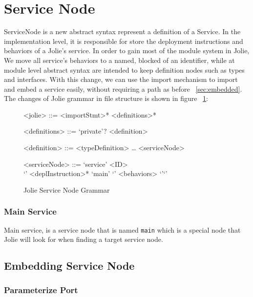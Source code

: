
\section{Service Node}

ServiceNode is a new abstract syntax represent a definition of a Service.
In the implementation level, it is responsible for store the deployment instructions and behaviors of a Jolie’s service.
In order to gain most of the module system in Jolie,  We move all service’s behaviors to a named, blocked of an identifier, while at module level abstract syntax are intended to keep definition nodes such as types and interfaces.
With this change, we can use the import mechanism to import and embed a service easily, without requiring a path as before ~\ref{sec:embedded}.
The changes of Jolie grammar in file structure is shown in figure ~\ref{fig:jolie-servicenode-grammar}:

\begin{figure}[h]
    \begin{framed}
        \begin{grammar}
            <jolie> ::= <importStmt>* <definitions>*

            <definitions> ::= `private'? <definition>

            <definition> ::=  <typeDefinition>
            \dots
            \alt <serviceNode>

            <serviceNode> ::= `service' <ID> \\ `{' <deplInstruction>* `main' `{' <behaviors> `}'`}'

        \end{grammar}
    \end{framed}
    \caption{Jolie Service Node Grammar}
    \label{fig:jolie-servicenode-grammar}
\end{figure}

\subsubsection*{Main Service}

Main service, is a service node that is named \texttt{main} which is a special node that Jolie will look for when finding a target service node.

\subsection{Embedding Service Node}

\subsubsection{Parameterize Port}

